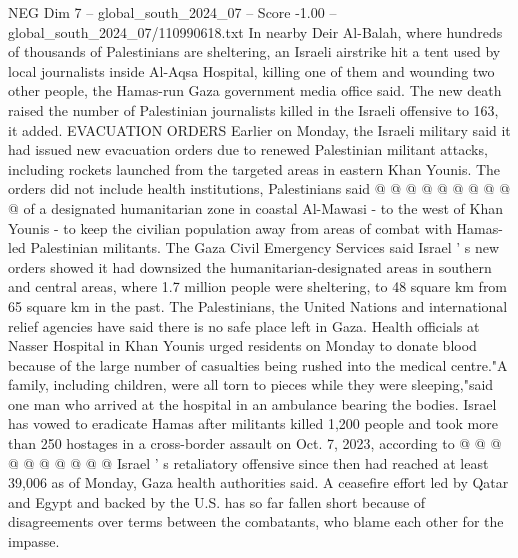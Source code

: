 \begin{textsample}{NEG Dim 7 – global\_south\_2024\_07 – Score -1.00 – global\_south\_2024\_07/110990618.txt}
In nearby Deir Al-Balah, where hundreds of thousands of Palestinians are sheltering, an Israeli airstrike hit a tent used by local journalists inside Al-Aqsa Hospital, killing one of them and wounding two other people, the Hamas-run Gaza government media office said.
The new death raised the number of Palestinian journalists killed in the Israeli offensive to 163, it added.
EVACUATION ORDERS Earlier on Monday, the Israeli military said it had issued new evacuation orders due to renewed Palestinian militant attacks, including rockets launched from the targeted areas in eastern Khan Younis.
The orders did not include health institutions, Palestinians said @ @ @ @ @ @ @ @ @ @ of a designated humanitarian zone in coastal Al-Mawasi - to the west of Khan Younis - to keep the civilian population away from areas of combat with Hamas-led Palestinian militants.
The Gaza Civil Emergency Services said Israel ' s new orders showed it had downsized the humanitarian-designated areas in southern and central areas, where 1.7 million people were sheltering, to 48 square km from 65 square km in the past.
The Palestinians, the United Nations and international relief agencies have said there is no safe place left in Gaza.
Health officials at Nasser Hospital in Khan Younis urged residents on Monday to donate blood because of the large number of casualties being rushed into the medical centre."A family, including children, were all torn to pieces while they were sleeping,"said one man who arrived at the hospital in an ambulance bearing the bodies.
Israel has vowed to eradicate Hamas after militants killed 1,200 people and took more than 250 hostages in a cross-border assault on Oct. 7, 2023, according to @ @ @ @ @ @ @ @ @ @ Israel ' s retaliatory offensive since then had reached at least 39,006 as of Monday, Gaza health authorities said.
A ceasefire effort led by Qatar and Egypt and backed by the U.S. has so far fallen short because of disagreements over terms between the combatants, who blame each other for the impasse.

\end{textsample}
